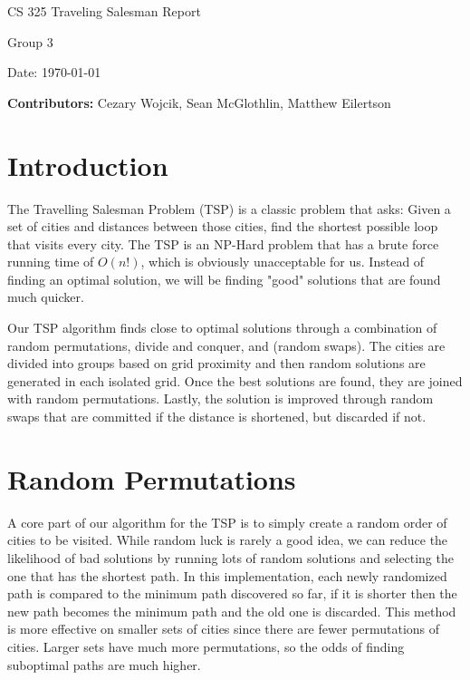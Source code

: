 \documentclass[12pt,letterpaper]{article}
\begin{document}
\begin{titlepage}
    \vspace*{4cm}
    {\huge \center
        CS 325 Traveling Salesman Report\\[1cm]
    }
    \center
    {\large
        Group 3

        Date: \today

    \textbf{Contributors:}
    Cezary Wojcik,
    Sean McGlothlin,
    Matthew Eilertson
    }

\end{titlepage}

\section*{Introduction}

The Travelling Salesman Problem (TSP) is a classic problem that asks: Given a set of cities and distances between those cities, find the shortest possible loop that visits every city. The TSP is an NP-Hard problem that has a brute force running time of $O(n!)$, which is obviously unacceptable for us. Instead of finding an optimal solution, we will be finding "good" solutions that are found much quicker.

Our TSP algorithm finds close to optimal solutions through a combination of random permutations, divide and conquer, and (random swaps). The cities are divided into groups based on grid proximity and then random solutions are generated in each isolated grid. Once the best solutions are found, they are joined with random permutations. Lastly, the solution is improved through random swaps that are committed if the distance is shortened, but discarded if not.



\section*{Random Permutations}

A core part of our algorithm for the TSP is to simply create a random order of cities to be visited. While random luck is rarely a good idea, we can reduce the likelihood of bad solutions by running lots of random solutions and selecting the one that has the shortest path. In this implementation, each newly randomized path is compared to the minimum path discovered so far, if it is shorter then the new path becomes the minimum path and the old one is discarded. This method is more effective on smaller sets of cities since there are fewer permutations of cities. Larger sets have much more permutations, so the odds of finding suboptimal paths are much higher.
\end{document}
